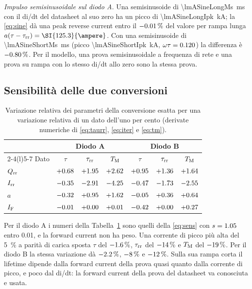 \documentclass[10pt,a4paper]{scrartcl}
\let\newcommand\lmitdefine
\newcommand{\IF}{I_\mathrm{F}}
\newcommand{\Irr}{I_\mathrm{rr}}
\newcommand{\Qrr}{Q_\mathrm{rr}}
\newcommand{\taurr}{\tau_\mathrm{rr}}
\newcommand{\TM}{T_\mathrm{M}}
\begin{document}
\emph{Impulso semisinusoidale sul diodo A.} Una semisinusoide di \SI{\lmASineLongMs}{\milli\second} con il di/dt del datasheet al suo zero ha un picco di \SI{\lmASineLongIpk}{\kilo\ampere}; la \eqref{eq:sine} dà una peak reverse current entro il $-0.01\,\%$ del valore per rampa lunga $a(\tau-\taurr) = \SI{\lmALongIrr}{\ampere}$. Con una semisinusoide di \SI{\lmASineShortMs}{\milli\second} (picco \SI{\lmASineShortIpk}{\kilo\ampere}, $\omega\tau = 0.120$) la differenza è $-0.80\,\%$. Per il modello, una prova semisinusoidale a frequenza di rete e una prova su rampa con lo stesso di/dt allo zero sono la stessa prova.

\subsection{Sensibilità delle due conversioni}
\begin{table}[htb]
\centering\small
\caption{Variazione relativa dei parametri della conversione esatta per una variazione relativa di un dato dell'uno per cento (derivate numeriche di \eqref{eq:taurr}, \eqref{eq:iter} e \eqref{eq:tm}).}
\label{tab:sensex}
\begin{tabular}{@{}lcccccc@{}}
\toprule
 & \multicolumn{3}{c}{Diodo A} & \multicolumn{3}{c}{Diodo B} \\
\cmidrule(lr){2-4}\cmidrule(l){5-7}
Dato & $\tau$ & $\taurr$ & $\TM$ & $\tau$ & $\taurr$ & $\TM$ \\
\midrule
$\Qrr$ & $+0.68$ & $+1.95$ & $+2.62$ & $+0.95$ & $+1.36$ & $+1.64$ \\
$\Irr$ & $-0.35$ & $-2.91$ & $-4.25$ & $-0.47$ & $-1.73$ & $-2.55$ \\
$a$ & $-0.32$ & $+0.95$ & $+1.62$ & $-0.05$ & $+0.36$ & $+0.64$ \\
$\IF$ & $-0.01$ & $+0.00$ & $+0.01$ & $-0.42$ & $+0.00$ & $+0.27$ \\
\bottomrule
\end{tabular}
\end{table}
Per il diodo A i numeri della Tabella~\ref{tab:sensex} sono quelli della \eqref{eq:sens} con $s = 1.05$ entro \num{0.01}, e la forward current non ha peso. Una corrente di picco più alta del \SI{5}{\percent} a parità di carica sposta $\tau$ del $-1.6\,\%$, $\taurr$ del $-14\,\%$ e $\TM$ del $-19\,\%$. Per il diodo B la stessa variazione dà $-2.2\,\%$, $-8\,\%$ e $-12\,\%$. Sulla sua rampa corta il lifetime dipende dalla forward current della prova quasi quanto dalla corrente di picco, e poco dal di/dt: la forward current della prova del datasheet va conosciuta e usata.
\end{document}
